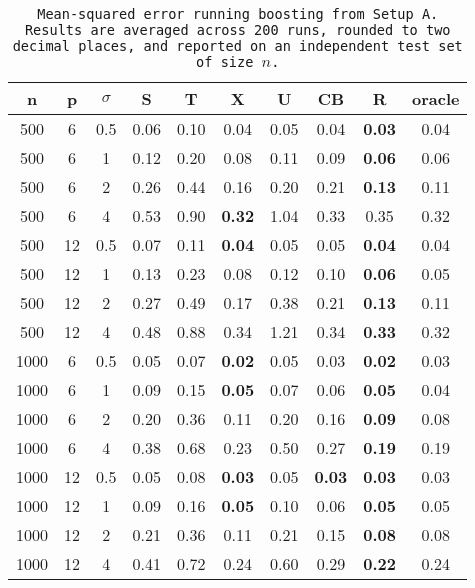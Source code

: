 \begin{table}[ht]
\centering
\begin{tabular}{cccccccccc}
  \hline
n & p & $\sigma$ & S & T & X & U & CB & R & oracle \\ 
  \hline
500 & 6 & 0.5 & 0.06 & 0.10 & 0.04 & 0.05 & 0.04 & \bf 0.03 & 0.04 \\ 
  500 & 6 & 1 & 0.12 & 0.20 & 0.08 & 0.11 & 0.09 & \bf 0.06 & 0.06 \\ 
  500 & 6 & 2 & 0.26 & 0.44 & 0.16 & 0.20 & 0.21 & \bf 0.13 & 0.11 \\ 
  500 & 6 & 4 & 0.53 & 0.90 & \bf 0.32 & 1.04 & 0.33 & 0.35 & 0.32 \\ 
  500 & 12 & 0.5 & 0.07 & 0.11 & \bf 0.04 & 0.05 & 0.05 & \bf 0.04 & 0.04 \\ 
  500 & 12 & 1 & 0.13 & 0.23 & 0.08 & 0.12 & 0.10 & \bf 0.06 & 0.05 \\ 
  500 & 12 & 2 & 0.27 & 0.49 & 0.17 & 0.38 & 0.21 & \bf 0.13 & 0.11 \\ 
  500 & 12 & 4 & 0.48 & 0.88 & 0.34 & 1.21 & 0.34 & \bf 0.33 & 0.32 \\ 
  1000 & 6 & 0.5 & 0.05 & 0.07 & \bf 0.02 & 0.05 & 0.03 & \bf 0.02 & 0.03 \\ 
  1000 & 6 & 1 & 0.09 & 0.15 & \bf 0.05 & 0.07 & 0.06 & \bf 0.05 & 0.04 \\ 
  1000 & 6 & 2 & 0.20 & 0.36 & 0.11 & 0.20 & 0.16 & \bf 0.09 & 0.08 \\ 
  1000 & 6 & 4 & 0.38 & 0.68 & 0.23 & 0.50 & 0.27 & \bf 0.19 & 0.19 \\ 
  1000 & 12 & 0.5 & 0.05 & 0.08 & \bf 0.03 & 0.05 & \bf 0.03 & \bf 0.03 & 0.03 \\ 
  1000 & 12 & 1 & 0.09 & 0.16 & \bf 0.05 & 0.10 & 0.06 & \bf 0.05 & 0.05 \\ 
  1000 & 12 & 2 & 0.21 & 0.36 & 0.11 & 0.21 & 0.15 & \bf 0.08 & 0.08 \\ 
  1000 & 12 & 4 & 0.41 & 0.72 & 0.24 & 0.60 & 0.29 & \bf 0.22 & 0.24 \\ 
   \hline
\end{tabular}
\caption{\tt Mean-squared error running \texttt{boosting} from Setup A. Results are averaged across 200 runs, rounded to two decimal places, and reported on an independent test set of size $n$.} 
\label{table:setup1}
\end{table}
